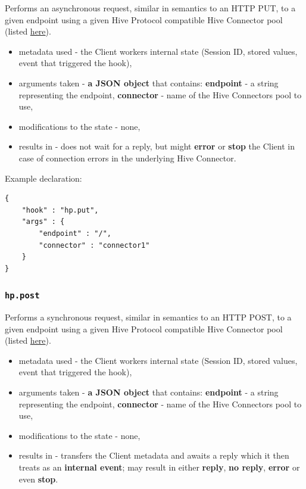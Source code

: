 \documentclass[a4paper]{article}
\begin{document}
Performs an asynchronous request, similar in semantics to an HTTP PUT, to a given endpoint using a given Hive Protocol compatible Hive Connector pool (listed \hyperref[ref-cp_connector]{here}).


\begin{itemize}
\item metadata used - the Client workers internal state (Session ID, stored values, event that triggered the hook),
\item arguments taken - \textbf{a JSON object} that contains: \textbf{endpoint} - a string representing the endpoint, \textbf{connector} - name of the Hive Connectors pool to use,
\item modifications to the state - none,
\item results in - does not wait for a reply, but might \textbf{error} or \textbf{stop} the Client in case of connection errors in the underlying Hive Connector.
\end{itemize}

\noindent
Example declaration:

\begin{verbatim}
{
    "hook" : "hp.put",
    "args" : {
        "endpoint" : "/",
        "connector" : "connector1"
    }
}
\end{verbatim}
\subsubsection{\texttt{hp.post}}
\label{sec-9-2-9}

Performs a synchronous request, similar in semantics to an HTTP POST, to a given endpoint using a given Hive Protocol compatible Hive Connector pool (listed \hyperref[ref-cp_connector]{here}).


\begin{itemize}
\item metadata used - the Client workers internal state (Session ID, stored values, event that triggered the hook),
\item arguments taken - \textbf{a JSON object} that contains: \textbf{endpoint} - a string representing the endpoint, \textbf{connector} - name of the Hive Connectors pool to use,
\item modifications to the state - none,
\item results in -  transfers the Client metadata and awaits a reply which it then treats as an \textbf{internal event}; may result in either \textbf{reply}, \textbf{no reply}, \textbf{error} or even \textbf{stop}.
\end{itemize}
\end{document}
